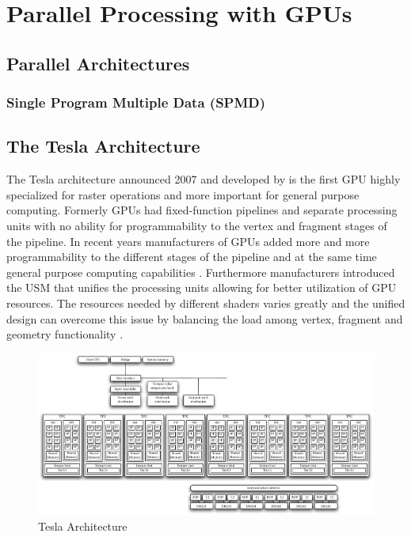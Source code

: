 \chapter{Parallel Processing with GPUs}%
\label{cha:parallel_processing_with_gpu} 

\section{Parallel Architectures}
\label{sec:parallel_architectures} 

\subsection{Single Program Multiple Data (SPMD)}
\label{ssub:single_program_multiple_data_spmd} 



\section{The Tesla Architecture}%
\label{sub:the_tesla_architecture} 
The Tesla architecture announced 2007 and developed by {} is the first
\gls{GPU} highly specialized for raster operations and more important
for general purpose computing. Formerly \glspl{GPU} had fixed-function
pipelines and separate processing units with no ability for programmability to
the vertex and fragment stages of the pipeline. In recent years manufacturers of
\glspl{GPU} added more and more programmability to the different stages
of the pipeline and at the same time general purpose computing capabilities
\citep{citeulike:3844545}. Furthermore manufacturers introduced the  \gls{USM} 
that unifies the processing units allowing for better
utilization of  \gls{GPU} resources. The resources needed by different
shaders varies greatly and the unified design can overcome this issue by
balancing the load among vertex, fragment and geometry functionality
\citep{citeulike:3145468}.

\begin{figure}[ht]
\centering
\includegraphics[width=\textwidth]{gfx/tesla_architecture} 
\caption{Tesla Architecture} 
\label{fig:tesla_architecture} 
\end{figure} 

